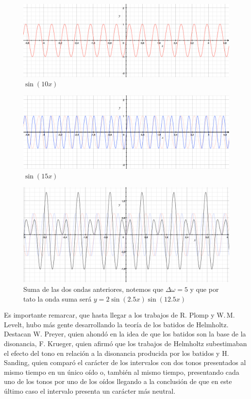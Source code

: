 \documentclass[11pt,a4paper]{article}
\begin{document}
	\begin{figure}[h]
		\centering
		\includegraphics[scale=.4]{S1}
		\caption{$\sin(10 x)$}
	\end{figure}
	\begin{figure}[h]
		\centering
		\includegraphics[scale=.4]{S2}
		\caption{$\sin(15 x)$}
	\end{figure}
	\begin{figure}[h!]
		\centering
		\includegraphics[scale=.4]{S3}
		\caption{Suma de las dos ondas anteriores, notemos que $\Delta \omega = 5$ y que por tato la onda suma será $y = 2 \sin(2.5 x) \sin(12.5 x)$}
	\end{figure}
	
	Es importante remarcar, que hasta llegar a los trabajos de R. Plomp y W.\,M. Levelt, hubo más gente desarrollando la teoría de los batidos de Helmholtz. Destacan \cite{PL} W. Preyer, quien ahondó en la idea de que los batidos son la base de la disonancia, F. Krueger, quien afirmó que los trabajos de Helmholtz subestimaban el efecto del tono en relación a la disonancia producida por los batidos y H. Sanding, quien comparó el carácter de los intervalos con dos tonos presentados al mismo tiempo en un único oído o, también al mismo tiempo, presentando cada uno de los tonos por uno de los oídos llegando a la conclusión de que en este último caso el intervalo presenta un carácter más neutral.
	
\end{document}
